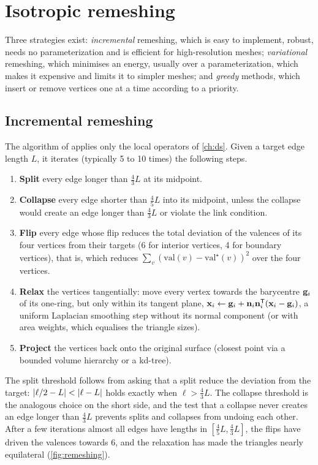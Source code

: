 \section{Isotropic remeshing}

Three strategies exist: \emph{incremental} remeshing, which is easy to implement, robust, needs
no parameterization and is efficient for high-resolution meshes; \emph{variational} remeshing,
which minimises an energy, usually over a parameterization, which makes it expensive and limits it
to simpler meshes; and \emph{greedy} methods, which insert or remove vertices one at a time
according to a priority.

\subsection{Incremental remeshing}

The algorithm of \citet{Botsch2004} applies only the local operators of \cref{ch:ds}. Given a target
edge length $L$, it iterates (typically 5 to 10 times) the following steps.
\begin{enumerate}
  \item \textbf{Split} every edge longer than $\tfrac43L$ at its midpoint.
  \item \textbf{Collapse} every edge shorter than $\tfrac45L$ into its midpoint, unless the collapse
  would create an edge longer than $\tfrac43L$ or violate the link condition.
  \item \textbf{Flip} every edge whose flip reduces the total deviation of the valences of its four
  vertices from their targets (6 for interior vertices, 4 for boundary vertices), that is, which
  reduces $\sum_{v}(\mathrm{val}(v)-\mathrm{val}^\star(v))^2$ over the four vertices.
  \item \textbf{Relax} the vertices tangentially: move every vertex towards the barycentre $\mathbf{g}_i$
  of its one-ring, but only within its tangent plane,
  $\mathbf{x}_i\leftarrow\mathbf{g}_i+\mathbf{n}_i\mathbf{n}_i^{\mathsf{T}}(\mathbf{x}_i-\mathbf{g}_i)$, a uniform Laplacian smoothing step without its
  normal component (or with area weights, which equalises the triangle sizes).
  \item \textbf{Project} the vertices back onto the original surface (closest point via a
  bounded volume hierarchy or a kd-tree).
\end{enumerate}
The split threshold follows from asking that a split reduce the deviation from the target:
$\left\lvert \ell/2-L\right\rvert<\left\lvert \ell-L\right\rvert$ holds exactly when $\ell>\tfrac43L$. The collapse threshold is the
analogous choice on the short side, and the test that a collapse never creates an edge longer than
$\tfrac43L$ prevents splits and collapses from undoing each other. After a few iterations almost all
edges have lengths in $[\tfrac45L,\tfrac43L]$, the flips have driven the valences towards 6, and the
relaxation has made the triangles nearly equilateral (\cref{fig:remeshing}).

